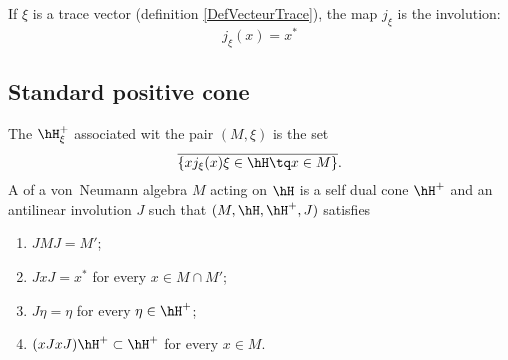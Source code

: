 If $\xi$ is a trace vector (definition \ref{DefVecteurTrace}), the map $j_{\xi}$ is the involution:
\begin{equation}
	j_{\xi}(x)=x^*
\end{equation}

\subsection{Standard positive cone}

The  $\hH_{\xi}^+$ associated wit the pair $(M,\xi)$ is the set
\begin{equation}
	\overline{ \{ xj_{\xi}(x)\xi\in\hH\tq x\in M \} }.
\end{equation}
A  of a von~Neumann algebra $M$ acting on $\hH$ is a self dual cone $\hH^+$ and an antilinear involution $J$ such that $(M,\hH,\hH^+,J)$ satisfies
\begin{enumerate}
	\item
		$JMJ=M'$;
	\item
		$JxJ=x^*$ for every $x\in M\cap M'$;
	\item
		$J\eta=\eta$ for every $\eta\in\hH^+$;
	\item
		$(xJxJ)\hH^+\subset\hH^+$ for every $x\in M$.
\end{enumerate}


\label{LaFin}
